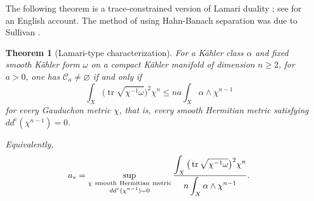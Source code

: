 \documentclass[reqno]{amsart}
\numberwithin{equation}{section}
\newtheorem{theorem}{Theorem}[section]
\theoremstyle{definition}
\DeclareMathOperator{\tr}{tr}
\begin{document}
The following theorem is a trace-constrained version of Lamari duality \cite[Lemme~3.3]{L99}; see \cite[Lemma~2.1]{Tosatti16} for an English account. The method of using Hahn-Banach separation was due to Sullivan \cite{Sullivan76}. 
\begin{theorem}[Lamari-type characterization]\label{thm:duality}
For a K\"ahler class $\alpha$ and fixed smooth K\"ahler form $\omega$ on a compact K\"ahler manifold of dimension $n\geq2$, for $a>0$, one has $\mathcal C_a\ne\varnothing$ if and only if
\[
 \int_X\bigl(\tr\sqrt{\chi^{-1}\omega}\bigr)^2\chi^n
 \le na\int_X\alpha\wedge\chi^{n-1}
\]
for every Gauduchon metric $\chi$, that is, every smooth Hermitian metric satisfying $dd^c(\chi^{n-1})=0$. 

Equivalently,
\begin{equation}\label{eq:duality}
a_*=
\sup_{\substack{\chi\ {\rm smooth\ Hermitian\  metric}\\dd^c(\chi^{n-1})=0}}
\frac{\displaystyle\int_X
 \big(\tr\sqrt{\chi^{-1}\omega}\big)^2\chi^n}
{\displaystyle n\int_X\alpha\wedge\chi^{n-1}}.
\end{equation}
\end{theorem}
\end{document}

